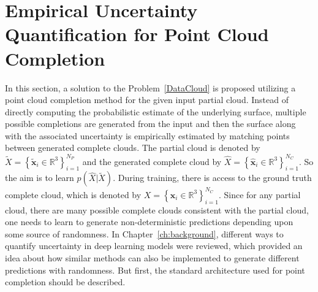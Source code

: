 \section{Empirical Uncertainty Quantification for Point Cloud Completion}\label{euqpcc}
In this section, a solution to the Problem~\ref{DataCloud} is proposed utilizing a point cloud completion method for the given input partial cloud. Instead of directly computing the probabilistic estimate of the underlying surface, multiple possible completions are generated from the input and then the surface along with the associated uncertainty is empirically estimated by matching points between generated complete clouds. The partial cloud is denoted by $\tilde{X}=\left\{\mathbf{\tilde{x}}_{i} \in \mathbb{R}^{3}\right\}_{i=1}^{N_P}$ and the generated complete cloud by $\hat{X}=\left\{\mathbf{\hat{x}}_{i} \in \mathbb{R}^{3}\right\}_{i=1}^{N_C}$. So the aim is to learn $p(\hat{X}|\tilde{X})$. During training, there is access to the ground truth complete cloud, which is denoted by $X=\left\{\mathbf{x}_{i} \in \mathbb{R}^{3}\right\}_{i=1}^{N_C}$. Since for any partial cloud, there are many possible complete clouds consistent with the partial cloud, one needs to learn to generate non-deterministic predictions depending upon some source of randomness. In Chapter~\ref{ch:background}, different ways to quantify uncertainty in deep learning models were reviewed, which provided an idea about how similar methods can also be implemented to generate different predictions with randomness. But first, the standard architecture used for point completion should be described.


